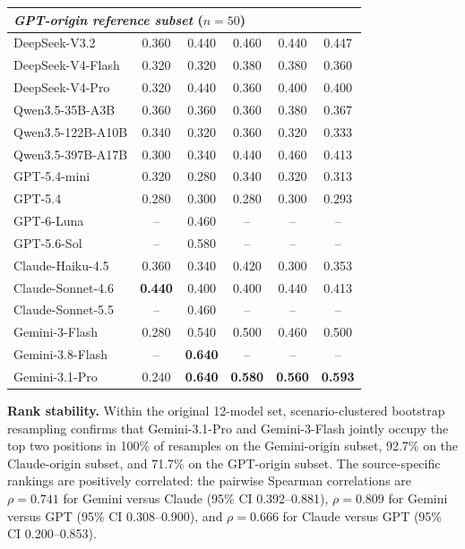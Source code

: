 \documentclass[11pt]{article}
\begin{document}
\begin{table}[!t]
\begin{tabular}{lc|ccc|c}
\midrule
\multicolumn{6}{l}{\textit{GPT-origin reference subset} ($n=50$)} \\
\midrule
\quad DeepSeek-V3.2              & 0.360 & 0.440 & 0.460 & 0.440 & 0.447 \\
\quad DeepSeek-V4-Flash          & 0.320 & 0.320 & 0.380 & 0.380 & 0.360 \\
\quad DeepSeek-V4-Pro            & 0.320 & 0.440 & 0.360 & 0.400 & 0.400 \\
\quad Qwen3.5-35B-A3B            & 0.360 & 0.360 & 0.360 & 0.380 & 0.367 \\
\quad Qwen3.5-122B-A10B          & 0.340 & 0.320 & 0.360 & 0.320 & 0.333 \\
\quad Qwen3.5-397B-A17B          & 0.300 & 0.340 & 0.440 & 0.460 & 0.413 \\
\quad GPT-5.4-mini               & 0.320 & 0.280 & 0.340 & 0.320 & 0.313 \\
\quad GPT-5.4                    & 0.280 & 0.300 & 0.280 & 0.300 & 0.293 \\
\quad GPT-6-Luna                  & -- & 0.460 & -- & -- & -- \\
\quad GPT-5.6-Sol                 & -- & 0.580 & -- & -- & -- \\
\quad Claude-Haiku-4.5           & 0.360 & 0.340 & 0.420 & 0.300 & 0.353 \\
\quad Claude-Sonnet-4.6          & \textbf{0.440} & 0.400 & 0.400 & 0.440 & 0.413 \\
\quad Claude-Sonnet-5.5           & -- & 0.460 & -- & -- & -- \\
\quad Gemini-3-Flash             & 0.280 & 0.540 & 0.500 & 0.460 & 0.500 \\
\quad Gemini-3.8-Flash            & -- & \textbf{0.640} & -- & -- & -- \\
\quad Gemini-3.1-Pro             & 0.240 & \textbf{0.640} & \textbf{0.580} & \textbf{0.560} & \textbf{0.593} \\
\bottomrule
\end{tabular}
\end{table}

\textbf{Rank stability.}
Within the original 12-model set, scenario-clustered bootstrap resampling confirms that Gemini-3.1-Pro and Gemini-3-Flash jointly occupy the top two positions in 100\% of resamples on the Gemini-origin subset, 92.7\% on the Claude-origin subset, and 71.7\% on the GPT-origin subset. The source-specific rankings are positively correlated: the pairwise Spearman correlations are $\rho{=}0.741$ for Gemini versus Claude (95\% CI 0.392--0.881), $\rho{=}0.809$ for Gemini versus GPT (95\% CI 0.308--0.900), and $\rho{=}0.666$ for Claude versus GPT (95\% CI 0.200--0.853).
\end{document}
